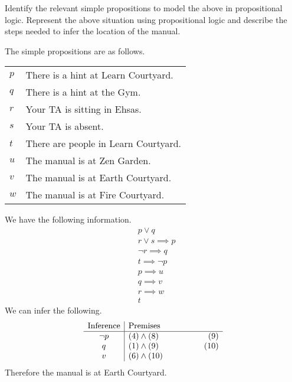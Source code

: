 \documentclass[addpoints]{exam}
\begin{document}
\begin{questions}
  Identify the relevant simple propositions to model the above in propositional logic. Represent the above situation using propositional logic and describe the steps needed to infer the location of the manual.
  \begin{solution}
    The simple propositions are as follows.\\
    \begin{tabularx}{\textwidth}{l@{ : }X}
      $p$ & There is a hint at Learn Courtyard.\\
      $q$ & There is a hint at the Gym.\\
      $r$ & Your TA is sitting in Ehsas.\\
      $s$ & Your TA is absent.\\
      $t$ & There are people in Learn Courtyard.\\
      $u$ & The manual is at Zen Garden.\\
      $v$ & The manual is at Earth Courtyard.\\
      $w$ & The manual is at Fire Courtyard.\\
    \end{tabularx}

    We have the following information.
    \begin{align}
      & p \lor q\\
      & r \lor s \implies p\\
      & \lnot r \implies q\\
      & t \implies \lnot p\\
      & p \implies u\\
      & q \implies v\\
      & r \implies w\\
      & t
    \end{align}
    We can infer the following.
    \[
      \begin{array}{c|l@{\hspace{50pt}}r}
        \text{Inference} & \text{Premises} & \\\hline
        \lnot p & (4) \land (8) & (9)\\
        q & (1) \land (9) & (10)\\
        v & (6) \land (10) & \\
      \end{array}
    \]
    Therefore the manual is at Earth Courtyard.
  \end{solution}
  
\end{questions}
\end{document}
